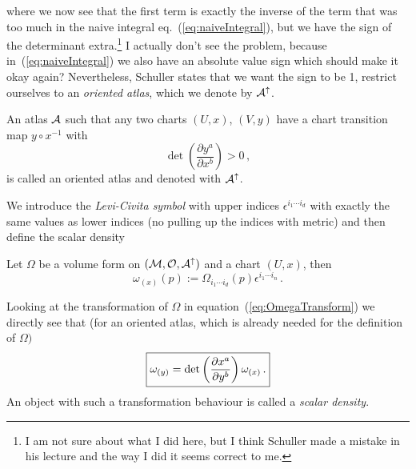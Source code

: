 \documentclass[11pt, a4paper, twocolumn]{article} %
\begin{document}
    where we now see that the first term is exactly the inverse of the term that was too much in
    the naive integral eq.~(\ref{eq:naiveIntegral}),
    but we have the sign of the determinant extra.\footnote{I am not sure about what I did here, but I think
    Schuller made a mistake in his lecture and the way I did it seems correct to me.}
    I actually don't see the problem, because in~(\ref{eq:naiveIntegral}) we also have an
    absolute value sign which should make it okay again?
    Nevertheless, Schuller states that we want the sign to be 1,
    restrict ourselves to an \textit{oriented atlas}, which we denote by
    $\mathcal{A}^\uparrow$.

    \begin{defn}
        An atlas $\mathcal{A}$ such that any two charts $(U,x)$, $(V,y)$ have
        a chart transition map $y\circ x^{-1}$ with
        \begin{equation}
            \det\left( \frac{\partial y^a}{\partial x^b} \right) > 0\,,
        \end{equation}
        is called an oriented atlas and denoted with $\mathcal{A}^\uparrow$.
    \end{defn}

    We introduce the \textit{Levi-Civita symbol} with upper indices $\epsilon^{i_1\cdots i_d}$ with
    exactly the same values as lower indices (no pulling up the indices with metric)
    and then define the scalar density
    \begin{defn}[$\omega_{(y)}$]
        Let $\Omega$ be a volume form on $(\mathcal{M},\mathcal{O}, \mathcal{A}^\uparrow)$
        and a chart $(U,x)$, then
        \begin{equation}
            \omega_{(x)}(p) := \Omega_{i_1\cdots i_d}(p)\epsilon^{i_1\cdots i_n}\,.
        \end{equation}
    \end{defn}
    Looking at the transformation of $\Omega$ in equation~(\ref{eq:OmegaTransform})
    we directly see that (for an oriented atlas, which is already needed for the definition
    of $\Omega)$
    \begin{equation}
        \boxed{%
            \omega_{(y)} = \det\left( \frac{\partial x^a}{\partial y^b} \right) \omega_{(x)}\,.
        }
    \end{equation}
    An object with such a transformation behaviour is called a \textit{scalar density}.
    






\newpage
\printbibliography[title={Bibliography}] %

\end{document}
